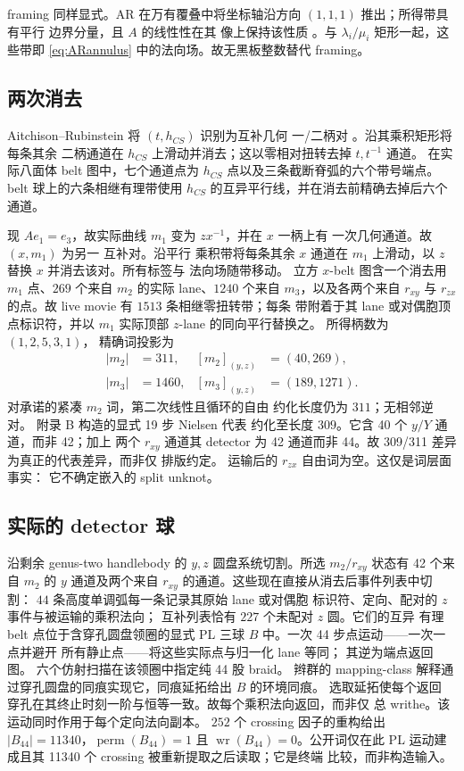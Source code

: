 framing 同样显式。AR 在万有覆叠中将坐标轴沿方向 $(1,1,1)$ 推出；所得带具有平行
边界分量，且 $A$ 的线性性在其
像上保持该性质 \cite[pp.~16--17]{AitchisonRubinstein1984}。与
$\lambda_i/\mu_i$ 矩形一起，这些带即 \eqref{eq:ARannulus} 中的法向场。故无黑板整数替代
framing。

\subsection{两次消去}

Aitchison--Rubinstein 将 $(t,h_{CS})$ 识别为互补几何
一/二柄对 \cite[p.~7]{AitchisonRubinstein1984}。沿其乘积矩形将每条其余
二柄通道在 $h_{CS}$ 上滑动并消去；这以零相对扭转去掉 $t,t^{-1}$ 通道。
在实际八面体 belt 图中，七个通道点为
$h_{CS}$ 点以及三条截断脊弧的六个带号端点。
belt 球上的六条相继有理带使用 $h_{CS}$ 的互异平行线，并在消去前精确去掉后六个通道。

现 $Ae_1=e_3$，故实际曲线 $m_1$ 变为 $zx^{-1}$，并在 $x$ 一柄上有
一次几何通道。故 $(x,m_1)$ 为另一
互补对。沿平行
乘积带将每条其余 $x$ 通道在 $m_1$ 上滑动，以 $z$ 替换 $x$ 并消去该对。所有标签与
法向场随带移动。
立方 $x$-belt 图含一个消去用 $m_1$ 点、$269$ 个来自 $m_2$ 的实际
lane、$1240$ 个来自 $m_3$，以及各两个来自 $r_{xy}$ 与
$r_{zx}$ 的点。故 live movie 有 $1513$ 条相继零扭转带；每条
带附着于其 lane 或对偶胞顶点标识符，并以 $m_1$ 实际顶部 $z$-lane 的同向平行替换之。
所得柄数为 $(1,2,5,3,1)$，
精确词投影为
\[
\begin{aligned}
|m_2|&=311, & [m_2]_{(y,z)}&=(40,269),\\
|m_3|&=1460, & [m_3]_{(y,z)}&=(189,1271).
\end{aligned}
\]
对承诺的紧凑 $m_2$ 词，第二次线性且循环的自由
约化长度仍为 $311$；无相邻逆对。
附录 B 构造的显式 19 步 Nielsen 代表
约化至长度 $309$。它含 40 个 $y/Y$ 通道，而非 42；加上
两个 $r_{xy}$ 通道其 detector 为 42 通道而非 44。故
309/311 差异为真正的代表差异，而非仅
排版约定。
运输后的 $r_{zx}$ 自由词为空。这仅是词层面事实：
它不确定嵌入的 split unknot。

\subsection{实际的 detector 球}

沿剩余 genus-two handlebody 的 $y,z$ 圆盘系统切割。所选
$m_2/r_{xy}$ 状态有 42 个来自 $m_2$ 的 $y$ 通道及两个来自
$r_{xy}$ 的通道。这些现在直接从消去后事件列表中切割：
$44$ 条高度单调弧每一条记录其原始 lane 或对偶胞
标识符、定向、配对的 $z$ 事件与被运输的乘积法向；
互补列表恰有 $227$ 个未配对 $z$ 圆。它们的互异
有理 belt 点位于含穿孔圆盘领圈的显式 PL 三球 $B$ 中。一次 44 步点运动——一次一点并避开
所有静止点——将这些实际点与归一化 lane 等同；
其逆为端点返回图。
六个仿射扫描在该领圈中指定纯 44 股 braid。
辫群的 mapping-class 解释通过穿孔圆盘的同痕实现它，同痕延拓给出 $B$ 的环境同痕。
选取延拓使每个返回
穿孔在其终止时刻一阶与恒等一致。故每个乘积法向返回，而非仅
总 writhe。该运动同时作用于每个定向法向副本。
$252$ 个 crossing 因子的重构给出
$|B_{44}|=11340$，$\operatorname{perm}(B_{44})=1$ 且
$\operatorname{wr}(B_{44})=0$。公开词仅在此 PL
运动建成且其 11340 个 crossing 被重新提取之后读取；它是终端
比较，而非构造输入。

